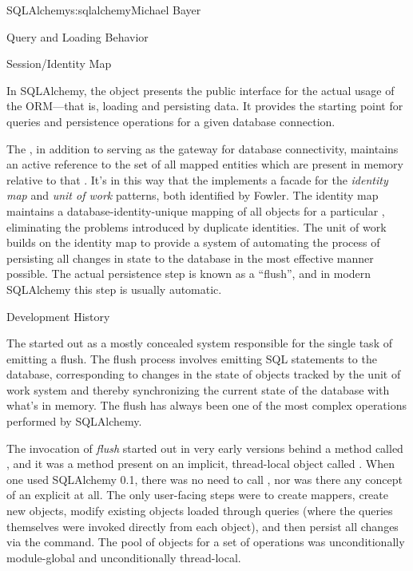 \begin{aosachapter}{SQLAlchemy}{s:sqlalchemy}{Michael Bayer}
\begin{aosasect1}{Query and Loading Behavior}
\end{aosasect1}

\begin{aosasect1}{Session/Identity Map}

In SQLAlchemy,
the  object presents the public interface for the actual usage of
the ORM---that is, loading and persisting data.  It provides the starting
point for queries and persistence operations for a given database connection.

The , in addition to serving as the gateway for database connectivity,
maintains an active reference to the set of all mapped entities which are present
in memory relative to that .  It's in this way that the 
implements a facade for the \emph{identity map} and \emph{unit of work} patterns, both
identified by Fowler.   The identity map maintains a database-identity-unique
mapping of all objects for a particular , eliminating the problems
introduced by duplicate identities.  The unit of work builds on the identity map
to provide a system of automating the process of persisting all changes in state to the
database in the most effective manner possible.   The actual persistence step
is known as a ``flush'', and in modern SQLAlchemy this step is usually automatic.

\begin{aosasect2}{Development History}

The  started out as a mostly concealed system responsible
for the single task of emitting a flush. The flush process involves emitting SQL
statements to the database, corresponding to changes in the state of objects
tracked by the unit of work system and thereby synchronizing the current state
of the database with what's in memory. The flush has always been one of the most
complex operations performed by SQLAlchemy.

The invocation of \emph{flush} started out in very early versions behind a method
called , and it was a method present on an implicit, thread-local
object called . When one used SQLAlchemy 0.1, there was no need
to call , nor was there any concept of an explicit
 at all. The only user-facing steps were to create mappers, create
new objects, modify existing objects loaded through queries (where the queries
themselves were invoked directly from each  object), and then
persist all changes via the  command.
The pool of objects for a set of operations
was unconditionally module-global and unconditionally thread-local.


\end{aosasect2}
\end{aosasect1}
\end{aosachapter}
